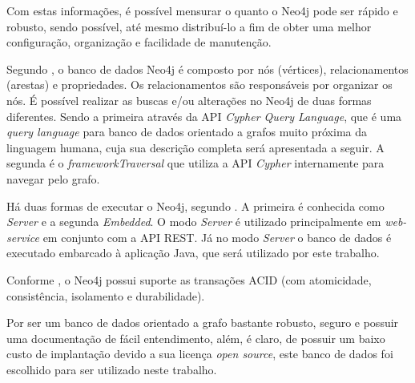 
\par Com estas informações, é possível mensurar o quanto o Neo4j pode ser rápido e robusto, sendo possível, até mesmo distribuí-lo a fim de obter uma melhor configuração, organização e facilidade de manutenção.

\par Segundo , o banco de dados Neo4j é composto por nós (vértices), relacionamentos (arestas) e propriedades. Os relacionamentos são responsáveis por organizar os nós. É possível realizar as buscas e/ou alterações no Neo4j de duas formas diferentes. Sendo a primeira através da API \textit{Cypher Query Language}, que é uma \textit{query language} para banco de dados orientado a grafos muito próxima da linguagem humana, cuja sua descrição completa será apresentada a seguir. A segunda é o \textit{framework\footnotemark[11] Traversal} que utiliza a API \textit{Cypher} internamente para navegar pelo grafo.


\par Há duas formas de executar o Neo4j, segundo . A primeira é conhecida como \textit{Server} e a segunda \textit{Embedded}. O modo \textit{Server} é utilizado principalmente em \textit{web-service} em conjunto com a API REST. Já no modo \textit{Server} o banco de dados é executado embarcado à aplicação Java, que será utilizado por este trabalho.

\par Conforme , o Neo4j possui suporte as transações ACID (com atomicidade, consistência, isolamento e durabilidade).

\par Por ser um banco de dados orientado a grafo bastante robusto, seguro e possuir uma documentação de fácil entendimento, além, é claro, de possuir um baixo custo de implantação devido a sua licença \textit{open source}, este banco de dados foi escolhido para ser utilizado neste trabalho.
